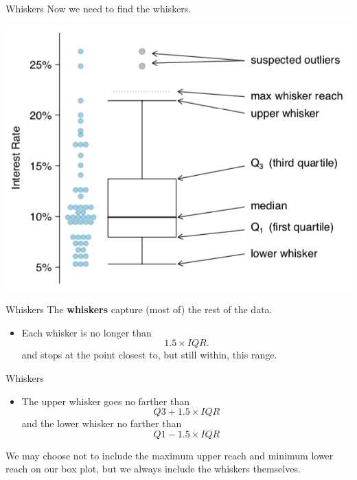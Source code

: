 \begin{frame}{Whiskers}
    Now we need to find the whiskers.
    \begin{center}
        \includegraphics[scale=0.35]{images/boxplot.png}
    \end{center}
\end{frame}

\begin{frame}{Whiskers}
    The \textbf{whiskers} capture (most of) the rest of the data.
    \begin{itemize}
        \item Each whisker is no longer than 
        \[
        1.5\times IQR.
        \]
        and stops at the point closest to, but still within, this range.
    \end{itemize}
\end{frame}

\begin{frame}{Whiskers}
    \begin{itemize}
        \item The upper whisker goes no farther than
        \[
        Q3 + 1.5 \times IQR
        \]
        and the lower whisker no farther than
        \[
        Q1 - 1.5 \times IQR
        \]
    \end{itemize}
    
    We may choose not to include the maximum upper reach and minimum lower reach on our box plot, but we always include the whiskers themselves. 
\end{frame}

